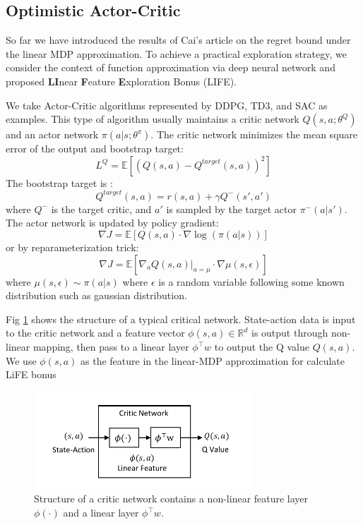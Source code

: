 \subsection{Optimistic Actor-Critic}
So far we have introduced the results of Cai's article on the regret bound under the linear MDP approximation. To achieve a practical exploration strategy, we consider the context of function approximation via deep neural network and proposed \textbf{LI}near \textbf{F}eature \textbf{E}xploration Bonus (LIFE).

We take Actor-Critic algorithms represented by DDPG, TD3, and SAC as examples. This type of algorithm usually maintains a critic network $Q(s,a;\theta^Q)$ and an actor network $\pi(a|s;\theta^\pi)$. The critic network minimizes the mean square error of the output and bootstrap target: \[L^Q=\mathbb{E}[(Q(s,a)-Q^{target}(s,a))^2]\]
The bootstrap target is :
\[Q^{target}(s,a)=r(s,a)+\gamma Q^-(s',a')\]
where $Q^-$ is the target critic, and $a'$ is sampled by the target actor $\pi^-(a|s')$. The actor network is updated by policy gradient:
\[\nabla J=\mathbb{E}[Q(s,a)\cdot \nabla\log(\pi(a|s))]\]
or by reparameterization trick: 
\[\nabla J=\mathbb{E}[\nabla_a Q(s,a)|_{a=\mu} \cdot \nabla \mu(s,\epsilon)]\]
where $\mu(s,\epsilon) \sim \pi(a|s)$ where $\epsilon$ is a random variable following some known distribution such as gaussian distribution.

Fig \ref{fig:critic} shows the structure of a typical critical network. State-action data is input to the critic network and a feature vector $\phi(s,a) \in \mathbb{R}^d$ is output through non-linear mapping, then pass to a linear layer $\phi^{\top} w$ to output the Q value $Q(s,a)$. We use $\phi(s,a)$ as the feature in the linear-MDP approximation for calculate LiFE bonus

\begin{figure}[!htb]
    \centering
    \includegraphics[width=230pt]{figs/Critic.pdf}
    \caption{Structure of a critic network contains a non-linear feature layer $\phi(\cdot)$ and a linear layer $\phi^{\top}w$.  }
    \label{fig:critic}
\end{figure}

